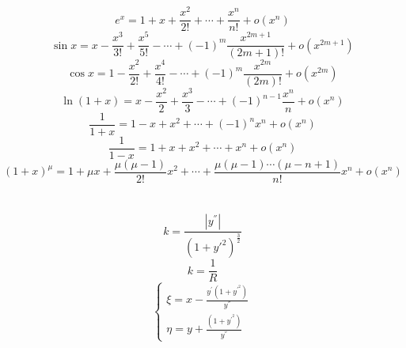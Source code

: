 \documentclass[]{article}
\numberwithin{equation}{section}
\begin{document}
\section{}
\begin{equation}
    e^x=1+x+\frac{x^2}{2!}+\cdots+\frac{x^n}{n!}+o(x^n)
\end{equation}
\begin{equation}
    \sin x=x-\frac{x^3}{3!}+\frac{x^5}{5!}-\cdots+(-1)^m\frac{x^{2m+1}}{(2m+1)!}+o(x^{2m+1})
\end{equation}
\begin{equation}
    \cos x=1-\frac{x^2}{2!}+\frac{x^4}{4!}-\cdots+(-1)^m\frac{x^{2m}}{(2m)!}+o(x^{2m})
\end{equation}
\begin{equation}
    \ln(1+x)=x-\frac{x^2}{2}+\frac{x^3}{3}-\cdots+(-1)^{n-1}\frac{x^n}{n}+o(x^n)
\end{equation}
\begin{equation}
    \frac{1}{1+x}=1-x+x^2+\cdots+(-1)^nx^n+o(x^n)
\end{equation}
\begin{equation}
    \frac{1}{1-x}=1+x+x^2+\cdots+x^n+o(x^n)
\end{equation}
\begin{equation}
    (1+x)^\mu=1+\mu x+\frac{\mu(\mu-1)}{2!}x^2+\cdots+\frac{\mu(\mu-1)\cdots(\mu-n+1)}{n!}x^n+o(x^n)
\end{equation}

\section{}
\begin{equation}
    k=\frac{\left|y^{''}\right|}{(1+y{'^2})^\frac{3}{2}}
\end{equation}
\begin{equation}
    k=\frac{1}{R}
\end{equation}
\begin{equation}
    \begin{cases}
        \xi=x-\frac{y^{'}(1+y^{'^2})}{y^{''}} \\
        \eta=y+\frac{(1+y^{'^2})}{y^{''}}
    \end{cases}
\end{equation}
\end{document}
